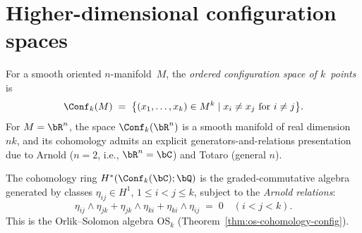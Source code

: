 
\section{Higher-dimensional configuration spaces}
\label{sec:higher-dim-config}

\begin{definition}
\label{def:config-rn}
For a smooth oriented $n$-manifold~$M$, the \emph{ordered
configuration space of $k$~points} is
\[
\Conf_k(M) \;=\;
\bigl\{(x_1, \ldots, x_k) \in M^k
 \mid x_i \neq x_j \text{ for } i \neq j\bigr\}.
\]
For $M = \bR^n$, the space $\Conf_k(\bR^n)$ is a smooth manifold
of real dimension~$nk$, and its cohomology admits an explicit
generators-and-relations presentation due to Arnold ($n = 2$, i.e., $\bR^n = \bC$) and
Totaro (general $n$).
\end{definition}

\begin{theorem}[Arnold presentation {\cite{Arnold69}}; \texorpdfstring{$\bC \cong \bR^2$}{C = R2};
\ClaimStatusProvedElsewhere]
\label{thm:arnold-presentation}
The cohomology ring $H^*(\Conf_k(\bC); \bQ)$ is the graded-commutative
algebra generated by classes $\eta_{ij} \in H^1$,
$1 \leq i < j \leq k$, subject to the \emph{Arnold relations}:
\begin{equation}\label{eq:arnold-rel-en}
\eta_{ij} \wedge \eta_{jk}
+ \eta_{jk} \wedge \eta_{ki}
+ \eta_{ki} \wedge \eta_{ij} \;=\; 0
\quad (i < j < k).
\end{equation}
This is the Orlik--Solomon algebra $\mathrm{OS}_k$
\textup{(}Theorem~\textup{\ref{thm:os-cohomology-config})}.
\end{theorem}

